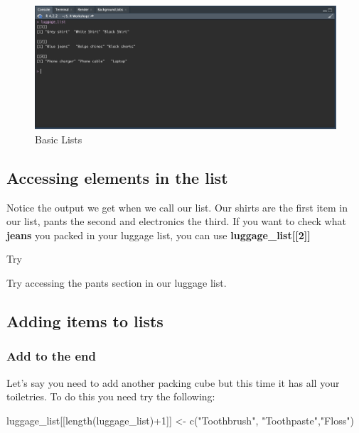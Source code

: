 \documentclass[
]{book}
\newenvironment{Shaded}{\begin{snugshade}}{\end{snugshade}}
\newcommand{\DecValTok}[1]{\textcolor[rgb]{0.00,0.00,0.81}{#1}}
\newcommand{\FunctionTok}[1]{\textcolor[rgb]{0.00,0.00,0.00}{#1}}
\newcommand{\NormalTok}[1]{#1}
\newcommand{\OtherTok}[1]{\textcolor[rgb]{0.56,0.35,0.01}{#1}}
\newcommand{\SpecialCharTok}[1]{\textcolor[rgb]{0.00,0.00,0.00}{#1}}
\newcommand{\StringTok}[1]{\textcolor[rgb]{0.31,0.60,0.02}{#1}}
\begin{document}
\begin{figure}
\includegraphics[width=29.36in]{images/3.6listconsole} \caption{Basic Lists}\label{fig:unnamed-chunk-17}
\end{figure}

\hypertarget{accessing-elements-in-the-list}{%
\subsection{Accessing elements in the list}\label{accessing-elements-in-the-list}}

Notice the output we get when we call our list. Our shirts are the first item in our list, pants the second and electronics the third. If you want to check what \textbf{jeans} you packed in your luggage list, you can use \textbf{luggage\_list{[}{[}2{]}{]}}

Try

Try accessing the pants section in our luggage list.

\hypertarget{adding-items-to-lists}{%
\subsection{Adding items to lists}\label{adding-items-to-lists}}

\hypertarget{add-to-the-end}{%
\subsubsection{Add to the end}\label{add-to-the-end}}

Let's say you need to add another packing cube but this time it has all your toiletries. To do this you need try the following:

\begin{Shaded}
\begin{Highlighting}[]
\NormalTok{luggage\_list[[}\FunctionTok{length}\NormalTok{(luggage\_list)}\SpecialCharTok{+}\DecValTok{1}\NormalTok{]] }\OtherTok{\textless{}{-}} \FunctionTok{c}\NormalTok{(}\StringTok{"Toothbrush"}\NormalTok{, }\StringTok{"Toothpaste"}\NormalTok{,}\StringTok{"Floss"}\NormalTok{)}
\end{Highlighting}
\end{Shaded}
\end{document}
